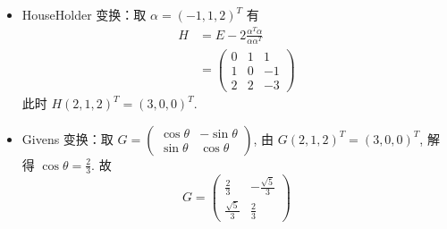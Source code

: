\documentclass{article}
\begin{document}
\begin{itemize}
    \item HouseHolder 变换：取 $\alpha = (-1, 1, 2)^T$ 有 
    \begin{align*}
        H &= E - 2\frac{\alpha^T\alpha}{\alpha\alpha^T} \\
        &= \begin{pmatrix}
            0 & 1 & 1 \\
            1 & 0 & -1 \\
            2 & 2 & -3
        \end{pmatrix}
    \end{align*}
    此时 $H(2, 1, 2)^T = (3, 0, 0)^T$. \\
    \item Givens 变换：取 $G = \begin{pmatrix}
        \cos \theta & -\sin \theta \\
        \sin \theta & \cos \theta
    \end{pmatrix}$, 由 $G(2, 1, 2)^T = (3, 0, 0)^T$, 解得 $\cos \theta = \frac{2}{3}$. 故 $$G = \begin{pmatrix}
        \frac{2}{3} & -\frac{\sqrt{5}}{3} \\
        \frac{\sqrt{5}}{3} & \frac{2}{3}
    \end{pmatrix}$$
    \end{itemize}
    
\end{document}
